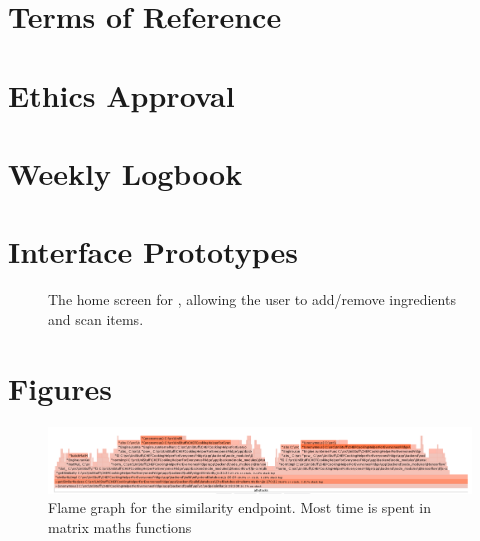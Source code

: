 \documentclass[11pt, twoside, a4paper]{report}
\begin{document}
\section{Terms of Reference}


\section{Ethics Approval}\label{sec:ethics_approval}


\section{Weekly Logbook}
\raggedbottom{}

\flushbottom{}



\section{Interface Prototypes}
\begin{figure}
    \centering
    
    \caption{The home screen for \chef{}, allowing the user to add/remove ingredients and scan items.}
\end{figure}

\section{Figures}
\begin{figure}
    \centering
    \caption{\label{fig:similarity_flamegraph}Flame graph for the similarity endpoint. Most time is spent in matrix maths functions}
    \includegraphics[angle=90,height=0.9\textheight]{figures/similarity_flamegraph.png}
\end{figure}
\end{document}
